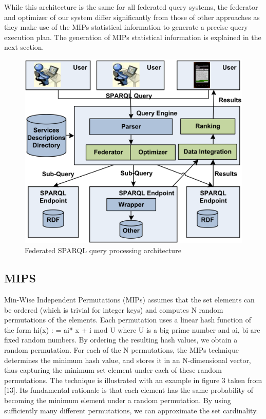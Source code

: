 \documentclass{sig-alternate}  %
\begin{document}
 While this architecture is the same
for all federated query systems, the federator and optimizer of our
system differ significantly from those of other approaches as they
make use of the MIPs statistical information to generate a precise
query execution plan. The generation of MIPs statistical information
is explained in the next section.
\begin{figure}
\begin{centering}
\includegraphics[scale=0.11]{Fig1} 
\par\end{centering}

\centering{}\caption{Federated SPARQL query processing architecture}
\end{figure}
\subsection{MIPS}
Min-Wise Independent Permutations (MIPs) assumes that the set elements can
be ordered (which is trivial for integer keys) and computes N random
permutations of the elements. Each permutation uses a linear hash
function of the form  hi(x) : = ai{*} x + i mod U 
where U is a big prime number and ai,
bi are fixed random numbers. By ordering the resulting
hash values, we obtain a random permutation. For each of the N permutations,
the MIPs technique determines the minimum hash value, and stores it
in an N-dimensional vector, thus capturing the minimum set element
under each of these random permutations. The technique is illustrated
with an example in figure 3 taken from {[}13{]}. Its fundamental rationale
is that each element has the same probability of becoming the minimum
element under a random permutation. By using sufficiently many different
permutations, we can approximate the set cardinality.
\end{document}
